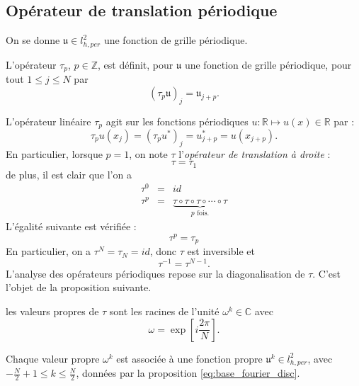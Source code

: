 \subsection{Opérateur de translation périodique}
On se donne $\mathfrak{u} \in l^2_{h,per}$ une fonction de grille périodique.
\begin{definition}
L'opérateur $\tau_p$, $p \in \mathbb{Z}$, est définit, pour $\mathfrak{u}$ une fonction de grille périodique, pour tout $1 \leq j \leq N$ par
\begin{equation}
(\tau_p \mathfrak{u})_j = \mathfrak{u}_{j+p}.
\end{equation}
\end{definition}
L'opérateur linéaire $\tau_p$ agit sur les fonctions périodiques $u : \mathbb{R} \mapsto u(x) \in \mathbb{R}$ par :
\begin{equation}
\tau_p u(x_j) = (\tau_p u^*)_j = u^*_{j+p} = u(x_{j+p}).
\end{equation}
En particulier, lorsque $p=1$, on note $\tau$ l'\textit{opérateur de translation à droite} :
\begin{equation}
\tau = \tau_{1}
\end{equation}
de plus, il est clair que l'on a
\begin{equation}
\begin{array}{rcl}
\tau^0 & = & id\\
\tau^p & = & \underbrace{\tau \circ \tau \circ \tau \circ \cdots \circ \tau}_{p \text{ fois.}}
\end{array}
\end{equation}
L'égalité suivante est vérifiée :
\begin{equation}
\tau^p = \tau_p
\end{equation}
En particulier, on a $\tau^N = \tau_N = id$, donc $\tau$ est inversible et
\begin{equation}
\tau^{-1} = \tau^{N-1}.
\end{equation}
L'analyse des opérateurs périodiques repose sur la diagonalisation de $\tau$. C'est l'objet de la proposition suivante.

\begin{proposition}
les valeurs propres de $\tau$ sont les racines de l'unité $\omega^k \in \mathbb{C}$ avec
\begin{equation}
\omega = \exp \left[ i \dfrac{2 \pi}{N} \right].
\end{equation}

Chaque valeur propre $\omega^k$ est associée à une fonction propre $\mathfrak{u}^k \in l^2_{h,per}$, avec $-\frac{N}{2}+1 \leq k \leq \frac{N}{2}$, données par la proposition \ref{eq:base_fourier_disc}.
\label{prop:eigenvaluevector_tau}
\end{proposition}

